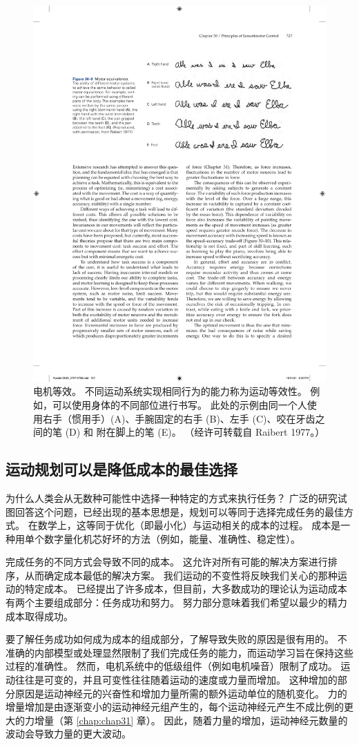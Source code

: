 \begin{figure}[htbp]
	\centering
	\includegraphics[width=0.7\linewidth]{chap30/fig_30_9}
	\caption{电机等效。 不同运动系统实现相同行为的能力称为运动等效性。 例如，可以使用身体的不同部位进行书写。 此处的示例由同一个人使用右手（惯用手）(A)、手腕固定的右手 (B)、左手 (C)、咬在牙齿之间的笔 (D) 和 附在脚上的笔 (E)。 （经许可转载自 Raibert 1977。）}
	\label{fig:30_9}
\end{figure}



\subsection{运动规划可以是降低成本的最佳选择}

为什么人类会从无数种可能性中选择一种特定的方式来执行任务？
广泛的研究试图回答这个问题，已经出现的基本思想是，规划可以等同于选择完成任务的最佳方式。
在数学上，这等同于优化（即最小化）与运动相关的成本的过程。
成本是一种用单个数字量化机芯好坏的方法（例如，能量、准确性、稳定性）。


完成任务的不同方式会导致不同的成本。
这允许对所有可能的解决方案进行排序，从而确定成本最低的解决方案。
我们运动的不变性将反映我们关心的那种运动的特定成本。
已经提出了许多成本，但目前，大多数成功的理论认为运动成本有两个主要组成部分：任务成功和努力。
努力部分意味着我们希望以最少的精力成本取得成功。


要了解任务成功如何成为成本的组成部分，了解导致失败的原因是很有用的。
不准确的内部模型或处理显然限制了我们完成任务的能力，而运动学习旨在保持这些过程的准确性。
然而，电机系统中的低级组件（例如电机噪音）限制了成功。
运动往往是可变的，并且可变性往往随着运动的速度或力量而增加。
这种增加的部分原因是运动神经元的兴奋性和增加力量所需的额外运动单位的随机变化。
力的增量增加是由逐渐变小的运动神经元组产生的，每个运动神经元产生不成比例的更大的力增量（第 \ref{chap:chap31} 章）。
因此，随着力量的增加，运动神经元数量的波动会导致力量的更大波动。


